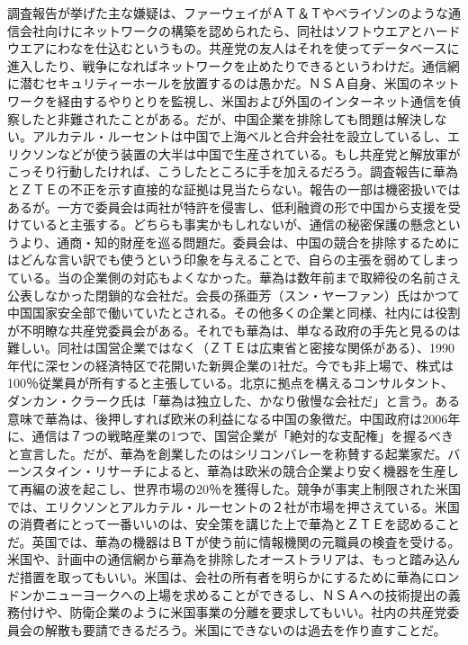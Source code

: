 調査報告が挙げた主な嫌疑は、ファーウェイがＡＴ＆Ｔやベライゾンのような通信会社向けにネットワークの構築を認められたら、同社はソフトウエアとハードウエアにわなを仕込むというもの。共産党の友人はそれを使ってデータベースに進入したり、戦争になればネットワークを止めたりできるというわけだ。通信網に潜むセキュリティーホールを放置するのは愚かだ。ＮＳＡ自身、米国のネットワークを経由するやりとりを監視し、米国および外国のインターネット通信を偵察したと非難されたことがある。だが、中国企業を排除しても問題は解決しない。アルカテル・ルーセントは中国で上海ベルと合弁会社を設立しているし、エリクソンなどが使う装置の大半は中国で生産されている。もし共産党と解放軍がこっそり行動したければ、こうしたところに手を加えるだろう。調査報告に華為とＺＴＥの不正を示す直接的な証拠は見当たらない。報告の一部は機密扱いではあるが。一方で委員会は両社が特許を侵害し、低利融資の形で中国から支援を受けていると主張する。どちらも事実かもしれないが、通信の秘密保護の懸念というより、通商・知的財産を巡る問題だ。委員会は、中国の競合を排除するためにはどんな言い訳でも使うという印象を与えることで、自らの主張を弱めてしまっている。当の企業側の対応もよくなかった。華為は数年前まで取締役の名前さえ公表しなかった閉鎖的な会社だ。会長の孫亜芳（スン・ヤーファン）氏はかつて中国国家安全部で働いていたとされる。その他多くの企業と同様、社内には役割が不明瞭な共産党委員会がある。それでも華為は、単なる政府の手先と見るのは難しい。同社は国営企業ではなく（ＺＴＥは広東省と密接な関係がある）、1990年代に深センの経済特区で花開いた新興企業の1社だ。今でも非上場で、株式は100％従業員が所有すると主張している。北京に拠点を構えるコンサルタント、ダンカン・クラーク氏は「華為は独立した、かなり傲慢な会社だ」と言う。ある意味で華為は、後押しすれば欧米の利益になる中国の象徴だ。中国政府は2006年に、通信は７つの戦略産業の1つで、国営企業が「絶対的な支配権」を握るべきと宣言した。だが、華為を創業したのはシリコンバレーを称賛する起業家だ。バーンスタイン・リサーチによると、華為は欧米の競合企業より安く機器を生産して再編の波を起こし、世界市場の20％を獲得した。競争が事実上制限された米国では、エリクソンとアルカテル・ルーセントの２社が市場を押さえている。米国の消費者にとって一番いいのは、安全策を講じた上で華為とＺＴＥを認めることだ。英国では、華為の機器はＢＴが使う前に情報機関の元職員の検査を受ける。米国や、計画中の通信網から華為を排除したオーストラリアは、もっと踏み込んだ措置を取ってもいい。米国は、会社の所有者を明らかにするために華為にロンドンかニューヨークへの上場を求めることができるし、ＮＳＡへの技術提出の義務付けや、防衛企業のように米国事業の分離を要求してもいい。社内の共産党委員会の解散も要請できるだろう。米国にできないのは過去を作り直すことだ。



